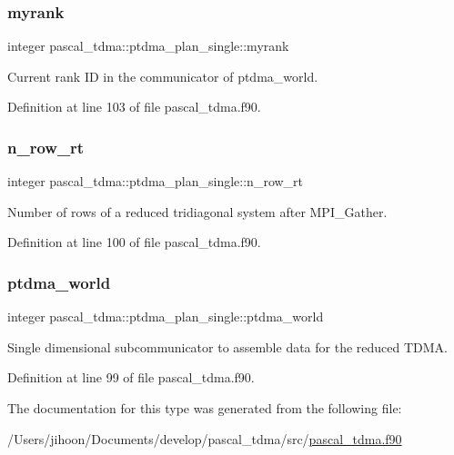 \subsubsection{\texorpdfstring{myrank}{myrank}}
{\footnotesize\ttfamily integer pascal\+\_\+tdma\+::ptdma\+\_\+plan\+\_\+single\+::myrank}



Current rank ID in the communicator of ptdma\+\_\+world. 



Definition at line 103 of file pascal\+\_\+tdma.\+f90.

\mbox{\label{structpascal__tdma_1_1ptdma__plan__single_a91fd8fb919f9b7d3137b13fcaa55dc1b}} 
\subsubsection{\texorpdfstring{n\_row\_rt}{n\_row\_rt}}
{\footnotesize\ttfamily integer pascal\+\_\+tdma\+::ptdma\+\_\+plan\+\_\+single\+::n\+\_\+row\+\_\+rt}



Number of rows of a reduced tridiagonal system after M\+P\+I\+\_\+\+Gather. 



Definition at line 100 of file pascal\+\_\+tdma.\+f90.

\mbox{\label{structpascal__tdma_1_1ptdma__plan__single_a073cddefd8ef983b185b6727d8ad7de6}} 
\subsubsection{\texorpdfstring{ptdma\_world}{ptdma\_world}}
{\footnotesize\ttfamily integer pascal\+\_\+tdma\+::ptdma\+\_\+plan\+\_\+single\+::ptdma\+\_\+world}



Single dimensional subcommunicator to assemble data for the reduced T\+D\+MA. 



Definition at line 99 of file pascal\+\_\+tdma.\+f90.



The documentation for this type was generated from the following file\+:\begin{DoxyCompactItemize}
\item 
/\+Users/jihoon/\+Documents/develop/pascal\+\_\+tdma/src/\mbox{\hyperlink{pascal__tdma_8f90}{pascal\+\_\+tdma.\+f90}}\end{DoxyCompactItemize}
